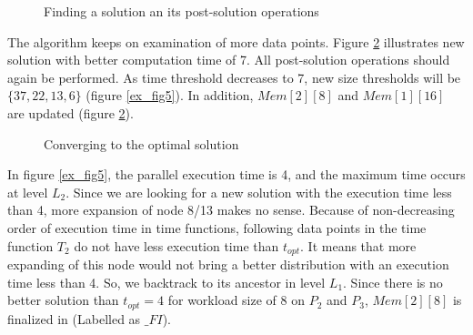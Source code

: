 \documentclass[12pt]{article}
\begin{document}
\begin{figure}[!t]
	\centering
	\caption{Finding a solution an its post-solution operations}
	\label{ex_fig3}
\end{figure}

The algorithm keeps on examination of more data points. Figure \ref{ex_fig4} illustrates new solution with better computation time of 7. All post-solution operations should again be performed. As time threshold decreases to 7, new size thresholds will be $\{37,22,13,6\}$ (figure \ref{ex_fig5}). In addition, $Mem[2][8]$ and $Mem[1][16]$ are updated (figure \ref{ex_fig4}).

\begin{figure}[!t]
	\centering
	\caption{Converging to the optimal solution}
	\label{ex_fig4}
\end{figure}

In figure \ref{ex_fig5}, the parallel execution time is 4, and the maximum time occurs at level $L_2$. Since we are looking for a new solution with the execution time less than 4, more expansion of node 8/13 makes no sense. Because of non-decreasing order of execution time in time functions, following data points in the time function $T_2$ do not have less execution time than $t_{opt}$. It means that more expanding of this node would not bring a better distribution with an execution time less than 4. So, we backtrack to its ancestor in level $L_1$. Since there is no better solution than $t_{opt}=4$ for workload size of 8 on $P_2$ and $P_3$, $Mem[2][8]$ is finalized in (Labelled as $\_FI$).
\end{document}
